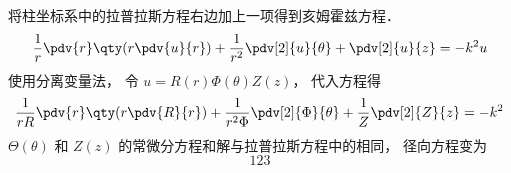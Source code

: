 
\begin{issues}
\issueDraft
\end{issues}


将柱坐标系中的拉普拉斯方程右边加上一项得到亥姆霍兹方程．
\begin{equation}
\frac{1}{r} \pdv{r} \qty(r\pdv{u}{r}) + \frac{1}{r^2} \pdv[2]{u}{\theta} + \pdv[2]{u}{z} = -k^2 u
\end{equation}
使用分离变量法， 令 $u = R(r) \Phi(\theta) Z(z)$， 代入方程得
\begin{equation}
\frac{1}{rR}\pdv{r} \qty(r\pdv{R}{r}) + \frac{1}{r^2 \Phi} \pdv[2]{\Phi}{\theta} + \frac{1}{Z} \pdv[2]{Z}{z} = -k^2
\end{equation}
$\Theta(\theta)$ 和 $Z(z)$ 的常微分方程和解与拉普拉斯方程中的相同， 径向方程变为
\begin{equation}
123
\end{equation}

